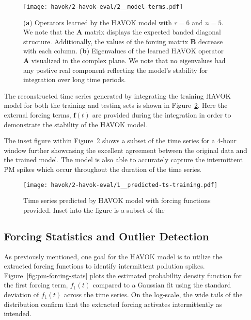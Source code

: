 \begin{figure}[h]
  \vspace{-2cm}
  \centering
  \texttt{[image: havok/2-havok-eval/2\_\_model-terms.pdf]}
  \caption{(\textbf{a}) Operators learned by the HAVOK model with $r=6$ and
    $n=5$. We note that the $\mathbf{A}$ matrix displays the expected banded
    diagonal  structure. Additionally, the values of the forcing matrix
    $\mathbf{B}$ decrease with each column. (\textbf{b}) Eigenvalues of the
    learned HAVOK operator $\mathbf{A}$ visualized in the complex plane. We note
    that no eigenvalues had any postive real component reflecting the model's
    stability for integration over long time periods.}
  \label{fig:pm-havok-operators}
\end{figure}

The reconstructed time series generated by integrating the training HAVOK model
for both the training and testing sets is shown in
Figure~\ref{fig:pm-havok-predictions}. Here the external forcing terms,
$\mathbf{f}(t)$ are provided during the integration in order to demonstrate the
stability of the HAVOK model.

The inset figure within Figure~\ref{fig:pm-havok-predictions} shows a subset of
the time series for a 4-hour window further showcasing the excellent agreement
between the original data and the trained model. The model is also able to
accurately capture the intermittent PM spikes which occur throughout the
duration of the time series.

\begin{figure}[h]
  \centering
  \texttt{[image: havok/2-havok-eval/1\_\_predicted-ts-training.pdf]}
  \caption{Time series predicted by HAVOK model with forcing functions provided.
  Inset into the figure is a subset of the }
  \label{fig:pm-havok-predictions}
\end{figure}


\subsection{Forcing Statistics and Outlier Detection}

As previously mentioned, one goal for the HAVOK model is to utilize the
extracted forcing functions to identify intermittent pollution spikes.
Figure~\ref{fig:pm-forcing-stats} plots the estimated probability density
function for the first forcing term, $f_1(t)$ compared to a Gaussian fit using
the standard deviation of $f_1(t)$ across the time series. On the log-scale, the
wide tails of the distribution confirm that the extracted forcing activates
intermittently as intended.

